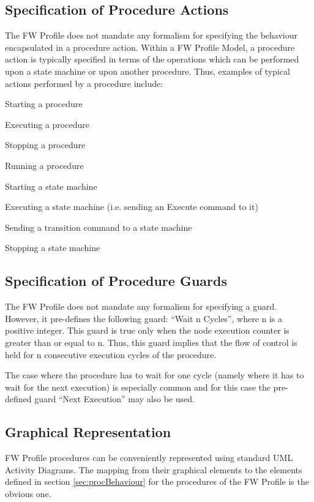 \documentclass[definition]{../fwprofile}
\begin{document}
\subsection{Specification of Procedure Actions}\label{sec:specProcActions} 
The FW Profile does not mandate any formalism for specifying the behaviour encapsulated in a procedure action. Within a FW Profile Model, a procedure action is typically specified in
terms of the operations which can be performed upon a state machine or upon another procedure.
Thus, examples of typical actions performed by a procedure include:

\begin{fw_itemize} 
\item Starting a procedure
\item Executing a procedure
\item Stopping a procedure
\item Running a procedure
\item Starting a state machine
\item Executing a state machine (i.e. sending an Execute command to it)
\item Sending a transition command to a state machine 
\item Stopping a state machine
\end{fw_itemize}

\subsection{Specification of Procedure Guards}
The FW Profile does not mandate any formalism for specifying a guard. However, it
pre-defines the following guard: “Wait n Cycles”, where n is a positive integer. This guard 
is true only when the node execution counter is greater than or equal to n. 
Thus, this guard implies that the flow of control is held for n
consecutive execution cycles of the procedure.

The case where the procedure has to wait for one cycle (namely where it has to wait for the
next execution) is especially common and for this case the pre-defined guard “Next Execution” may also
be used.

\subsection{Graphical Representation}\label{sec:procGraphRep} 
FW Profile procedures can be conveniently represented using standard UML Activity Diagrams. The mapping from their graphical elements to the elements defined in section \ref{sec:procBehaviour} for the procedures of the FW Profile is the obvious one.
\end{document}
